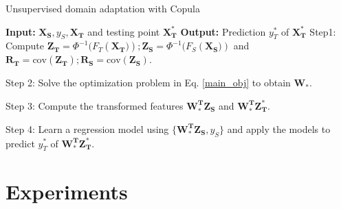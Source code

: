 \documentclass{article}
\begin{document}
\begin{algorithm}
		\caption{Unsupervised domain adaptation with Copula} 
        \begin{algorithmic}
        \Statex \textbf{Input:} $\boldsymbol{X_S}, y_S, \boldsymbol{X_T} $ and testing point $\boldsymbol{X^*_T} $ 
           \Statex	\textbf{Output:} Prediction $y^*_T$  of $\boldsymbol{X^*_T} $ 
           \vspace{0.1cm}
           \Statex Step1: Compute $\boldsymbol{ Z_T}=\Phi^{-1}(F_T(\boldsymbol{X_T)} ); \boldsymbol{Z_S} =\Phi^{-1}(F_S( \boldsymbol{X_S)})$ and $\boldsymbol{R_T}=\text{cov} (\boldsymbol{Z_T}); \boldsymbol{R_S}=\text{cov}(\boldsymbol{Z_S})$.
           
      \Statex Step 2:  Solve the optimization problem in Eq. \ref{main_obj} to obtain $\boldsymbol{W_*}.$
      
      \Statex Step 3: Compute the transformed features $\boldsymbol{W_*^T} \boldsymbol{Z_S} $ and $\boldsymbol{W_*^T}  \boldsymbol{Z^*_T} $.
      
      \Statex Step 4: Learn a regression model using $\{\boldsymbol{W_*^T} \boldsymbol{Z_S}, y_S \}$ and apply the models to predict $y^*_T$ of $\boldsymbol{W_*^T}  \boldsymbol{Z^*_T}. $
      
        \end{algorithmic} 
	\end{algorithm}
	
	
\section{Experiments}\label{sec:experiments}
	
\end{document}
